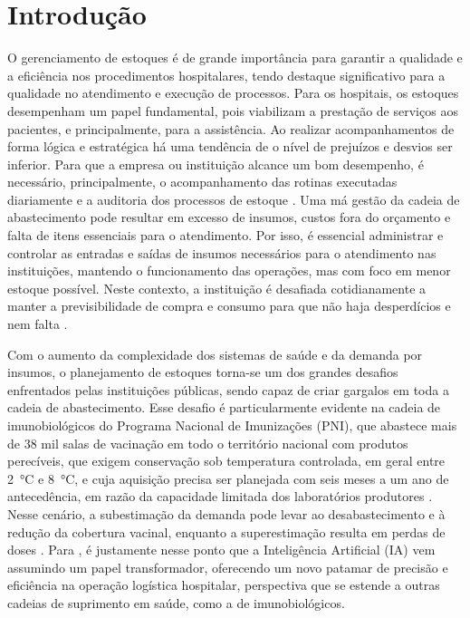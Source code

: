 \documentclass[
    12pt,                %
    openright,           %
    oneside,             %
    a4paper,             %
    english,             %
    brazil               %
]{abntex2}
\begin{document}
\textual

\chapter{Introdução}
\label{cap:introducao}

O gerenciamento de estoques é de grande importância para garantir a qualidade e a eficiência nos procedimentos hospitalares, tendo destaque significativo para a qualidade no atendimento e execução de processos. Para os hospitais, os estoques desempenham um papel fundamental, pois viabilizam a prestação de serviços aos pacientes, e principalmente, para a assistência. Ao realizar acompanhamentos de forma lógica e estratégica há uma tendência de o nível de prejuízos e desvios ser inferior. Para que a empresa ou instituição alcance um bom desempenho, é necessário, principalmente, o acompanhamento das rotinas executadas diariamente e a auditoria dos processos de estoque . Uma má gestão da cadeia de abastecimento pode resultar em excesso de insumos, custos fora do orçamento e falta de itens essenciais para o atendimento. Por isso, é essencial administrar e controlar as entradas e saídas de insumos necessários para o atendimento nas instituições, mantendo o funcionamento das operações, mas com foco em menor estoque possível. Neste contexto, a instituição é desafiada cotidianamente a manter a previsibilidade de compra e consumo para que não haja desperdícios e nem falta .

Com o aumento da complexidade dos sistemas de saúde e da demanda por insumos, o planejamento de estoques torna-se um dos grandes desafios enfrentados pelas instituições públicas, sendo capaz de criar gargalos em toda a cadeia de abastecimento. Esse desafio é particularmente evidente na cadeia de imunobiológicos do Programa Nacional de Imunizações (PNI), que abastece mais de 38 mil salas de vacinação em todo o território nacional com produtos perecíveis, que exigem conservação sob temperatura controlada, em geral entre 2~°C e 8~°C, e cuja aquisição precisa ser planejada com seis meses a um ano de antecedência, em razão da capacidade limitada dos laboratórios produtores \cite{Lopes2022}. Nesse cenário, a subestimação da demanda pode levar ao desabastecimento e à redução da cobertura vacinal, enquanto a superestimação resulta em perdas de doses \cite{Hariharan2020}. Para , é justamente nesse ponto que a Inteligência Artificial (IA) vem assumindo um papel transformador, oferecendo um novo patamar de precisão e eficiência na operação logística hospitalar, perspectiva que se estende a outras cadeias de suprimento em saúde, como a de imunobiológicos.
\end{document}
